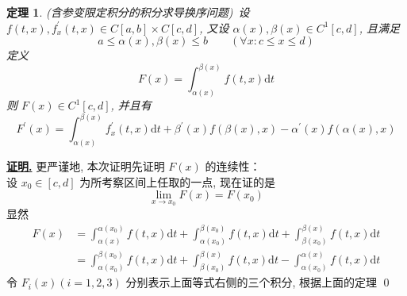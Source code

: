\documentclass[10pt,a4paper]{book}
\theoremstyle{thmstyle} %
\newtheorem{theorem}{定理}[chapter]
\theoremstyle{defstyle} %
\theoremstyle{prostyle} %
\renewenvironment{proof}[1][证明]{\par{\kaishu \uline{\textbf{#1.}}} \;\fangsong}{\qed\par}
\begin{document}
		\begin{theorem}
			(含参变限定积分的积分求导换序问题\textsuperscript{\cite{GDJ}})\ 设 $f\left( t,x \right) ,f_{x}^{\prime}\left( t,x \right)\in C[a,b]\times C[c,d]$, 又设 $\alpha(x),\beta(x)\in C^1[c,d]$, 且满足
			$$
			a\leqslant \alpha \left( x \right) ,\beta \left( x \right) \leqslant b\quad \quad \left( \forall x:c\leqslant x\leqslant d \right) 
			$$
			定义
			$$
			F\left( x \right) =\int_{\alpha(x)}^{\beta(x)}{f\left( t,x \right) \mathrm{d}t}
			$$
			则 $F(x)\in C^1[c,d]$, 并且有
			$$
			F^{\prime}\left( x \right) =\int_{\alpha \left( x \right)}^{\beta \left( x \right)}{f_{x}^{\prime}\left( t,x \right) \mathrm{d}t+\beta ^\prime\left( x \right) f\left( \beta \left( x \right) ,x \right) -\alpha ^{\prime}\left( x \right) f\left( \alpha \left( x \right) ,x \right)}
			$$
		\end{theorem}
	\begin{proof}
		更严谨地, 本次证明先证明 $F(x)$ 的连续性：\\
		设 $x_0\in[c,d]$ 为所考察区间上任取的一点, 现在证的是
		$$
		\lim\limits_{x\rightarrow x_0}F(x)=F(x_0)
		$$
		显然
		\begin{align*}
				F\left( x \right) &=\int_{\alpha \left( x \right)}^{\alpha \left( x_0 \right)}{f\left( t,x \right) \mathrm{d}t+}\int_{\alpha \left( x_0 \right)}^{\beta \left( x_0 \right)}{f\left( t,x \right) \mathrm{d}t+}\int_{\beta \left( x_0 \right)}^{\beta \left( x \right)}{f\left( t,x \right) \mathrm{d}t}\\
				&=\int_{\alpha \left( x_0 \right)}^{\beta \left( x_0 \right)}{f\left( t,x \right) \mathrm{d}t+}\int_{\beta \left( x_0 \right)}^{\beta \left( x \right)}{f\left( t,x \right) \mathrm{d}t-}\int_{\alpha \left( x_0 \right)}^{\alpha \left( x \right)}{f\left( t,x \right) \mathrm{d}t}
		\end{align*}
		令 $F_i(x)(i=1,2,3)$ 分别表示上面等式右侧的三个积分, 根据上面的定理
	\end{proof}
	
	
	
	
\end{document}
